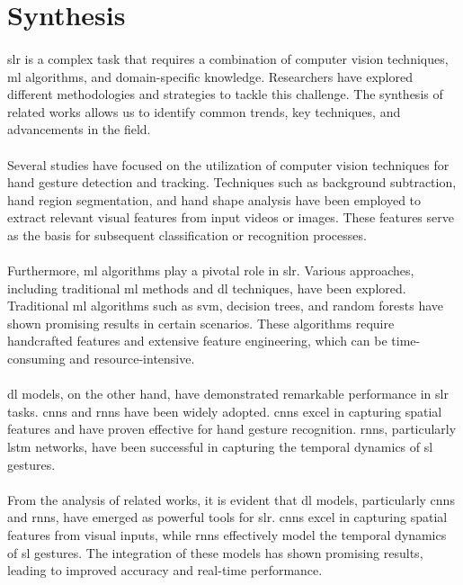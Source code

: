 \section{Synthesis}
\paragraph{}
\ac{slr} is a complex task that requires a combination of computer vision techniques, \ac{ml} algorithms, and domain-specific knowledge. Researchers have explored different methodologies and strategies to tackle this challenge. The synthesis of related works allows us to identify common trends, key techniques, and advancements in the field.
\paragraph{}
Several studies have focused on the utilization of computer vision techniques for hand gesture detection and tracking. Techniques such as background subtraction, hand region segmentation, and hand shape analysis have been employed to extract relevant visual features from input videos or images. These features serve as the basis for subsequent classification or recognition processes.
\paragraph{}
Furthermore, \ac{ml} algorithms play a pivotal role in \ac{slr}. Various approaches, including traditional \ac{ml} methods and \ac{dl} techniques, have been explored. Traditional \ac{ml} algorithms such as \ac{svm}, decision trees, and random forests have shown promising results in certain scenarios. These algorithms require handcrafted features and extensive feature engineering, which can be time-consuming and resource-intensive.
\paragraph{}
\ac{dl} models, on the other hand, have demonstrated remarkable performance in \ac{slr} tasks. \ac{cnn}s and \ac{rnn}s have been widely adopted. \ac{cnn}s excel in capturing spatial features and have proven effective for hand gesture recognition. \ac{rnn}s, particularly \ac{lstm} networks, have been successful in capturing the temporal dynamics of \ac{sl} gestures.
\paragraph{}
From the analysis of related works, it is evident that \ac{dl} models, particularly \ac{cnn}s and \ac{rnn}s, have emerged as powerful tools for \ac{slr}. \ac{cnn}s excel in capturing spatial features from visual inputs, while \ac{rnn}s effectively model the temporal dynamics of \ac{sl} gestures. The integration of these models has shown promising results, leading to improved accuracy and real-time performance.
